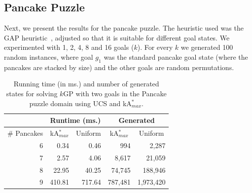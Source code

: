 \documentclass{aicom2e}
\newcommand{\kgs}{$k$GP}
\newcommand{\kastar}{kA$^*$}
\newcommand{\kastarmax}{kA$^*_{max}$}
\newcommand{\kxastar}{k$\times$A$^*$}
\newcommand{\roni}[1]{\textbf{[RS:#1]}}
\begin{document}


\subsection{Pancake Puzzle}




Next, we present the results for the pancake puzzle. The heuristic used was the
GAP heuristic~\cite{helmert2010landmark}, adjusted so that it is suitable for
different goal states.
We experimented with 1, 2, 4, 8 and 16 goals ($k$). For every $k$ we generated
100 random instances, where goal $g_1$ was the standard pancake goal state
(where the pancakes are stacked by size) and the other goals are random
permutations. %


\begin{table}[]
    \centering
    \begin{tabular}{|r|r|r|r|r|}
        \hline
        \multicolumn{1}{|l|}{}            & \multicolumn{2}{c|}{Runtime (ms.)}                                       & \multicolumn{2}{c|}{Generated} \\ \hline
        \multicolumn{1}{|c|}{\# Pancakes} & \multicolumn{1}{c}{\kastarmax{}} & \multicolumn{1}{c|}{Uniform} & \multicolumn{1}{c}{\kastarmax{}} & \multicolumn{1}{c|}{Uniform} \\ \hline
        6                               & 0.34                                      & 0.46                        & 994                                       & 2,287                       \\
        7                               & 2.57                                      & 4.06                        & 8,617                                     & 21,059                      \\
        8                               & 22.95                                     & 40.25                       & 74,745                                    & 188,946                     \\
        9                               & 410.81                                    & 717.64                      & 787,481                                   &
        1,973,420\\
        \hline
    \end{tabular}
    \caption{Running time (in ms.) and number of generated states for solving \kgs{} with two goals
        in the Pancake puzzle domain using UCS and \kastarmax{}.}
    \label{tab:pancake-max-uniform}
\end{table}
\end{document}
